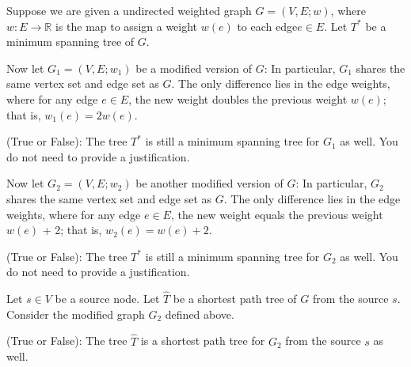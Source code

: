 \begin{prob}
    Suppose we are given a undirected weighted graph $G = (V, E; w)$, where $w: E\to \mathbb{R}$ is the map to assign a weight $w(e)$ to each edge$e\in E$.
    Let $T^*$ be a minimum spanning tree of $G$.


    \begin{subprobset}
        \begin{subprob}
    Now let $G_1 = (V, E; w_1)$ be a modified version of $G$: In particular, $G_1$ shares the same vertex set and edge set as $G$. The only difference lies in the edge weights, where for any edge $e\in E$, the new weight doubles the previous weight $w(e)$; that is, $w_1(e) = 2 w(e)$.

    (True or False): The tree $T^*$ is still a minimum spanning tree for $G_1$ as well. You do not need to provide a justification.
    \begin{soln}
        \Tf{}
    \end{soln}
    \end{subprob}
    \begin{subprob}
    Now let $G_2 = (V, E; w_2)$ be another modified version of $G$: In particular, $G_2$ shares the same vertex set and edge set as $G$. The only difference lies in the edge weights, where for any edge $e\in E$, the new weight equals the previous weight $w(e)$ + 2; that is, $w_2(e) = w(e)+2$.

    (True or False): The tree $T^*$ is still a minimum spanning tree for $G_2$ as well. You do not need to provide a justification.
    \begin{soln}
        \Tf{}
    \end{soln}
    \end{subprob}
     \begin{subprob}
     Let $s\in V$ be a source node. Let $\widehat{T}$ be a shortest path tree of $G$ from the source $s$.
     Consider the modified graph $G_2$ defined above.

     (True or False): The tree $\widehat{T}$ is a shortest path tree for $G_2$  from the source $s$ as well.
     \begin{soln}
        \tF{}
     \end{soln}
    \end{subprob}
    \end{subprobset}
\end{prob}
